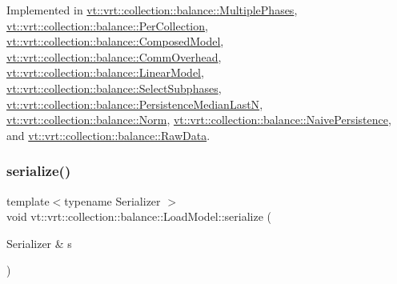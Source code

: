 Implemented in \hyperlink{structvt_1_1vrt_1_1collection_1_1balance_1_1_multiple_phases_a5adc006905ed0521ba40827df6d15575}{vt\+::vrt\+::collection\+::balance\+::\+Multiple\+Phases}, \hyperlink{structvt_1_1vrt_1_1collection_1_1balance_1_1_per_collection_a39813c26fddb8c8cdd6996187f42c173}{vt\+::vrt\+::collection\+::balance\+::\+Per\+Collection}, \hyperlink{classvt_1_1vrt_1_1collection_1_1balance_1_1_composed_model_a5de9a43648cfd18ca00f1f0a6c61be4d}{vt\+::vrt\+::collection\+::balance\+::\+Composed\+Model}, \hyperlink{structvt_1_1vrt_1_1collection_1_1balance_1_1_comm_overhead_ab44aa1c71e7925c248aefe611f76f5c8}{vt\+::vrt\+::collection\+::balance\+::\+Comm\+Overhead}, \hyperlink{structvt_1_1vrt_1_1collection_1_1balance_1_1_linear_model_a21150f198d266175ea015c0caebad5b5}{vt\+::vrt\+::collection\+::balance\+::\+Linear\+Model}, \hyperlink{classvt_1_1vrt_1_1collection_1_1balance_1_1_select_subphases_abca8bb1ca9edf950931d1bfd026c0474}{vt\+::vrt\+::collection\+::balance\+::\+Select\+Subphases}, \hyperlink{structvt_1_1vrt_1_1collection_1_1balance_1_1_persistence_median_last_n_ac8ce962b50e41326109cc2f87fa19cf0}{vt\+::vrt\+::collection\+::balance\+::\+Persistence\+Median\+LastN}, \hyperlink{classvt_1_1vrt_1_1collection_1_1balance_1_1_norm_a377ea9ef65f621d12db2030414a2deda}{vt\+::vrt\+::collection\+::balance\+::\+Norm}, \hyperlink{structvt_1_1vrt_1_1collection_1_1balance_1_1_naive_persistence_a1cea196b4ca24d5bad5f350f0adcd721}{vt\+::vrt\+::collection\+::balance\+::\+Naive\+Persistence}, and \hyperlink{structvt_1_1vrt_1_1collection_1_1balance_1_1_raw_data_abb4ce5d944f229b411d9a3b61f370822}{vt\+::vrt\+::collection\+::balance\+::\+Raw\+Data}.

\mbox{\label{classvt_1_1vrt_1_1collection_1_1balance_1_1_load_model_a52e2210225947697a235b75c385eb104}} 
\subsubsection{\texorpdfstring{serialize()}{serialize()}}
{\footnotesize\ttfamily template$<$typename Serializer $>$ \\
void vt\+::vrt\+::collection\+::balance\+::\+Load\+Model\+::serialize (\begin{DoxyParamCaption}\item[{Serializer \&}]{s }\end{DoxyParamCaption})\hspace{0.3cm}{\ttfamily [inline]}}


